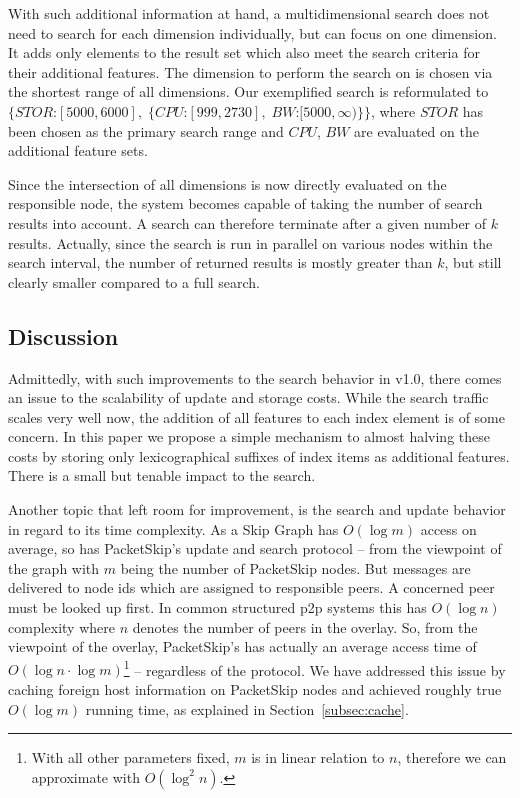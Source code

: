 With such additional information at hand, a multidimensional search does not need to search for each dimension individually, but can focus on one dimension. It adds only elements to the result set which also meet the search criteria for their additional features. The dimension to perform the search on is chosen via the shortest range of all dimensions. 
Our exemplified search is reformulated to
$\{STOR\text{:}[5000,6000],\; \{CPU\text{:}[999,2730],\; BW\text{:}[5000,\infty)\}\}$, where $STOR$ has been chosen as the primary search range and $CPU$, $BW$ are evaluated on the additional feature sets.

Since the intersection of all dimensions is now directly evaluated on the responsible node, the system becomes capable of taking the number of search results into account. A search can therefore terminate after a given number of $k$ results. Actually, since the search is run in parallel on various nodes within the search interval, the number of returned results is mostly greater than $k$, but still clearly smaller compared to a full search.

\subsection{Discussion}
\label{subsec:discussion}

Admittedly, with such improvements to the search behavior in v1.0, there comes an issue to the scalability of update and storage costs. While the search traffic scales very well now, the addition of all features to each index element is of some concern. In this paper we propose a simple mechanism to almost halving these costs by storing only lexicographical suffixes of index items as additional features. There is a small but tenable impact to the search.

Another topic that left room for improvement, is the search and update behavior in regard to its time complexity. As a Skip Graph has $O(\log{m})$ access on average, so has PacketSkip's update and search protocol -- from the viewpoint of the graph with $m$ being the number of PacketSkip nodes. But messages are delivered to node ids which are assigned to responsible peers. A concerned peer must be looked up first. In common structured p2p systems this has $O(\log{n})$ complexity where $n$ denotes the number of peers in the overlay. So, from the viewpoint of the overlay, PacketSkip's has actually an average access time of $O(\log{n} \cdot \log{m})$\footnote{With all other parameters fixed, $m$ is in linear relation to $n$, therefore we can approximate with $O(\log^2{n})$.}
-- regardless of the protocol. We have addressed this issue by caching foreign host information on PacketSkip nodes and achieved roughly true $O(\log{m})$ running time, as explained in Section~\ref{subsec:cache}.
